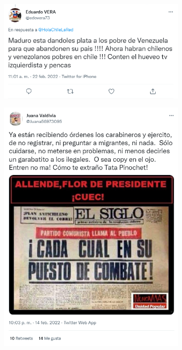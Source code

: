     \clearpage
    \begin{figure}[H]
        \caption{Random Selection of Tweets, Right-Leaning Users}
        \label{random_tweets_rig}
        
        \centering
            \begin{subfigure}{0.49\textwidth}
                \centering
                \includegraphics[width=.99\linewidth]{figs/tweet_right_1.png}
            \end{subfigure}%
            \begin{subfigure}{0.49\textwidth}
                \centering
                \includegraphics[width=.99\linewidth]{figs/tweet_right_2.png}

\end{subfigure}
\end{figure}
